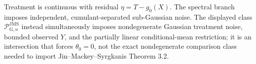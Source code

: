 Treatment is continuous with residual \(\eta=T-g_0(X)\). The spectral branch imposes independent, cumulant-separated sub-Gaussian noise. The displayed class \(\mathcal P_{\mathrm G,n}^{\mathrm{JMS}}\) instead simultaneously imposes nondegenerate Gaussian treatment noise, bounded observed \(Y\), and the partially linear conditional-mean restriction; it is an intersection that forces \(\theta_0=0\), not the exact nondegenerate comparison class needed to import Jin--Mackey--Syrgkanis Theorem 3.2.